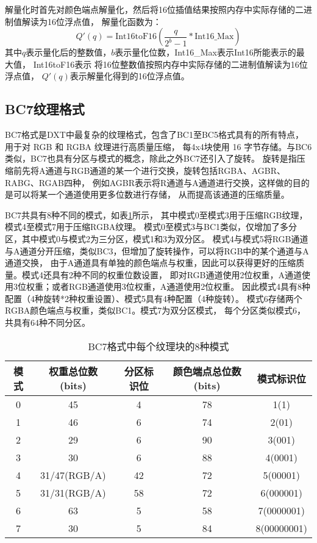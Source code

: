 解量化时首先对颜色端点解量化，然后将16位插值结果按照内存中实际存储的二进制值解读为16位浮点值，
解量化函数为：
\begin{equation}\label{eqn-6}
    Q'(q)=\text{Int16toF16}(\frac{q}{2^{b}-1}*\text{Int16\_Max})
\end{equation}
其中$q$表示量化后的整数值，$b$表示量化位数，Int16\_Max表示Int16所能表示的最大值，
Int16toF16表示
将16位整数值按照内存中实际存储的二进制值解读为16位浮点值，
$Q'(q)$表示解量化得到的16位浮点值。



\subsection{BC7纹理格式}

BC7格式是DXT中最复杂的纹理格式，包含了BC1至BC5格式具有的所有特点，
用于对 RGB 和 RGBA 纹理进行高质量压缩，
每4x4块使用 16 字节存储。与BC6类似，BC7也具有分区与模式的概念，除此之外BC7还引入了旋转。
旋转是指压缩前先将A通道与RGB通道的某一个进行交换，旋转包括RGBA、AGBR、RABG、RGAB四种，
例如AGBR表示将R通道与A通道进行交换，这样做的目的是可以将某一个通道使用更多位数进行存储，
从而提高该通道的压缩质量。

BC7共具有8种不同的模式，如表\ref{tab:BC7Mode}所示，
其中模式0至模式3用于压缩RGB纹理，模式4至模式7用于压缩RGBA纹理。
模式0至模式3与BC1类似，仅增加了多分区，其中模式0与模式2为三分区，模式1和3为双分区。
模式4与模式5将RGB通道与A通道分开压缩，类似BC3，但增加了旋转操作，可以将RGB中的某个通道与A通道交换，
由于A通道具有单独的颜色端点与权重，因此可以获得更好的压缩质量。模式4还具有2种不同的权重位数设置，
即对RGB通道使用2位权重，A通道使用3位权重；或者RGB通道使用3位权重，A通道使用2位权重。
因此模式4具有8种配置（4种旋转*2种权重设置）、模式5具有4种配置（4种旋转）。
模式6存储两个RGBA颜色端点与权重，类似BC1。模式7为双分区模式，
每个分区类似模式6，共具有64种不同分区。

\begin{table}[htbp]
    \centering
    \caption{BC7格式中每个纹理块的8种模式\cite{BC7}}
    \label{tab:BC7Mode}        
    \begin{tabular}{ccccc}
    \toprule
    模式 & 权重总位数(bits) & 分区标识位 & 颜色端点总位数(bits) & 模式标识位\\
    \midrule
    0   &   45    &  4  &   78  &   1(1)   \\
    1   &   46    &  6  &   74  &   2(01)   \\
    2   &   29    &  6  &   90  &   3(001)   \\
    3   &   30    &  6  &   88  &   4(0001)   \\
    4   &   31/47(RGB/A)    &  42  &   72  &   5(00001)   \\
    5   &   31/31(RGB/A)    &  58  &   72  &   6(000001)   \\
    6   &   63    &  5  &   58  &   7(0000001)   \\
    7   &   30    &  5  &   84  &   8(00000001)   \\
    \bottomrule
    \end{tabular}
\end{table}


